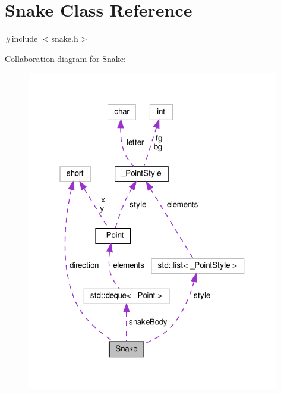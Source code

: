 \hypertarget{class_snake}{}\section{Snake Class Reference}
\label{class_snake}


{\ttfamily \#include $<$snake.\+h$>$}



Collaboration diagram for Snake\+:
\nopagebreak
\begin{figure}[H]
\begin{center}
\leavevmode
\includegraphics[width=313pt]{class_snake__coll__graph}
\end{center}
\end{figure}
